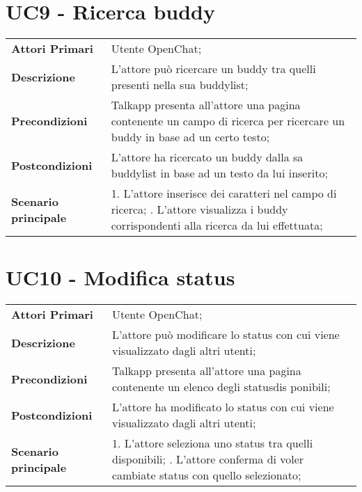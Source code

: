 \section{UC9 - Ricerca buddy}
\begin{center}
	\bgroup
	\def\arraystretch{1.8}     
	\begin{longtable}{  p{4cm} | p{9.5cm} } 
		\textbf{Attori Primari} & Utente OpenChat; \\ 
		\textbf{Descrizione} &  L'attore può ricercare un  buddy tra quelli presenti nella sua buddylist; \\ 
		\textbf{Precondizioni}  & Talkapp presenta all'attore una pagina contenente un campo di ricerca per ricercare un buddy in base ad un certo testo; \\
		\textbf{Postcondizioni} & L'attore ha ricercato un buddy dalla sa buddylist in base ad un testo da lui inserito;  \\ 
		\textbf{Scenario principale} & 
		1. L'attore inserisce dei caratteri nel campo di ricerca; \newline
		2. L'attore visualizza i buddy corrispondenti alla ricerca da lui effettuata;
	\end{longtable}
	\egroup
\end{center}

\section{UC10 - Modifica status}
\begin{center}
	\bgroup
	\def\arraystretch{1.8}     
	\begin{longtable}{  p{4cm} | p{9.5cm} } 
		\textbf{Attori Primari} & Utente OpenChat; \\ 
		\textbf{Descrizione} &  L'attore può modificare lo status con cui viene visualizzato dagli altri utenti; \\ 
		\textbf{Precondizioni}  & Talkapp presenta all'attore una pagina contenente un elenco degli statusdis ponibili; \\
		\textbf{Postcondizioni} & L'attore ha modificato lo status con cui viene visualizzato dagli altri utenti; \\ 
		\textbf{Scenario principale} & 
		1. L'attore seleziona uno status tra quelli disponibili; \newline
		2. L'attore conferma di voler cambiate status con quello selezionato;
	\end{longtable}
	\egroup
\end{center}

